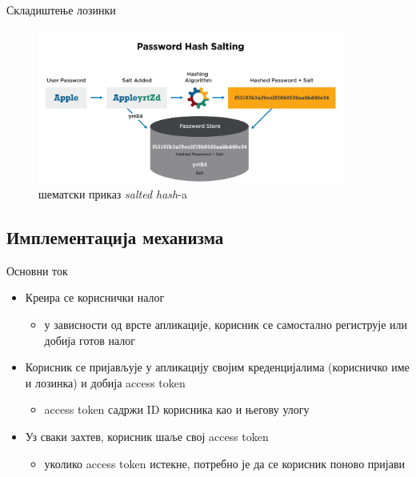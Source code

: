 \documentclass[aspectratio=169]{beamer}
\begin{document}
\begin{frame}[allowframebreaks]{Складиштење лозинки}
\begin{itemize}
            \framebreak
        
            \begin{figure}
                \centering
                \includegraphics[width=0.9\textwidth,height=\textheight,keepaspectratio]{images/hashsalt.png}
                \caption{шематски приказ \textit{salted hash}-a}
                \label{fig:hashsalt}
            \end{figure}
        \end{itemize}
    \end{frame}
    
    \subsection[]{Имплементација механизма}
    
    \begin{frame}{Основни ток}
        \begin{itemize}
            \item Креира се кориснички налог
            \begin{itemize}
                \item у зависности од врсте апликације, корисник се самостално региструје или добија готов налог
            \end{itemize}
            \item Корисник се пријављује у апликацију својим креденцијалима (корисничко име и лозинка) и добија access token
            \begin{itemize}
                \item access token садржи ID корисника као и његову улогу
            \end{itemize}
            \item Уз сваки захтев, корисник шаље свој access token
            \begin{itemize}
                \item уколико access token истекне, потребно је да се корисник поново пријави
            \end{itemize}
        \end{itemize}
    \end{frame}
    
\end{document}
